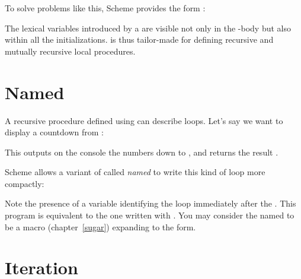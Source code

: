 To solve problems like this, Scheme provides the form
:


\n The lexical variables introduced by a  are
visible not only in the -body but also within
all the initializations.   is thus
tailor-made for defining recursive and mutually
recursive local procedures.


\section{Named }

A recursive procedure defined using  can
describe loops.  Let’s say we want to display a
countdown from :


\n This outputs on the console the numbers  down to
, and returns the result .

Scheme allows a variant of  called {\em named}
 to write this kind of loop more compactly:


\n Note the presence of a variable identifying the loop
immediately after the .  This program is
equivalent to the one written with .  You may
consider the named  to be a macro
(chapter~\ref{sugar}) expanding to the  form.


\section{Iteration}

